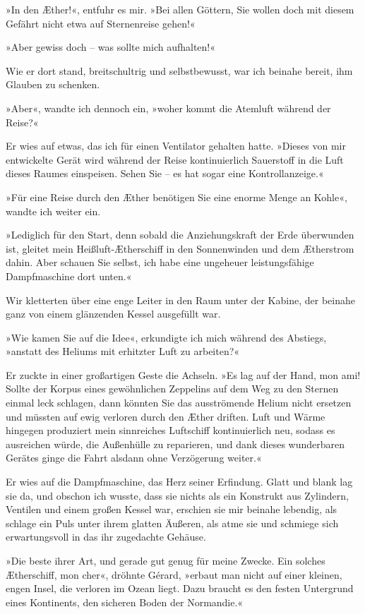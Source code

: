 »In den Æther!«, entfuhr es mir. »Bei allen Göttern, Sie wollen
doch mit diesem Gefährt nicht etwa auf Sternenreise gehen!«

»Aber gewiss doch – was sollte mich aufhalten!«

Wie er dort stand, breitschultrig und selbstbewusst, war ich
beinahe bereit, ihm Glauben zu schenken.

»Aber«, wandte ich dennoch ein, »woher kommt die Atemluft während
der Reise?«

Er wies auf etwas, das ich für einen Ventilator gehalten hatte.
»Dieses von mir entwickelte Gerät wird während der Reise
kontinuierlich Sauerstoff in die Luft dieses Raumes einspeisen.
Sehen Sie – es hat sogar eine Kontrollanzeige.«

»Für eine Reise durch den Æther benötigen Sie eine enorme Menge an
Kohle«, wandte ich weiter ein.

»Lediglich für den Start, denn sobald die Anziehungskraft der Erde
überwunden ist, gleitet mein Heißluft-Ætherschiff in den
Sonnenwinden und dem Ætherstrom dahin. Aber schauen Sie selbst, ich
habe eine ungeheuer leistungsfähige Dampfmaschine dort unten.«

Wir kletterten über eine enge Leiter in den Raum unter der Kabine,
der beinahe ganz von einem glänzenden Kessel ausgefüllt war.

»Wie kamen Sie auf die Idee«, erkundigte ich mich während des
Abstiegs, »anstatt des Heliums mit erhitzter Luft zu arbeiten?«

Er zuckte in einer großartigen Geste die Achseln. »Es lag auf der
Hand, mon ami! Sollte der Korpus eines gewöhnlichen Zeppelins auf
dem Weg zu den Sternen einmal leck schlagen, dann könnten Sie das
ausströmende Helium nicht ersetzen und müssten auf ewig verloren
durch den Æther driften. Luft und Wärme hingegen produziert mein
sinnreiches Luftschiff kontinuierlich neu, sodass es ausreichen
würde, die Außenhülle zu reparieren, und dank dieses wunderbaren
Gerätes ginge die Fahrt alsdann ohne Verzögerung weiter.«

Er wies auf die Dampfmaschine, das Herz seiner Erfindung. Glatt und
blank lag sie da, und obschon ich wusste, dass sie nichts als ein
Konstrukt aus Zylindern, Ventilen und einem großen Kessel war,
erschien sie mir beinahe lebendig, als schlage ein Puls unter ihrem
glatten Äußeren, als atme sie und schmiege sich erwartungsvoll in
das ihr zugedachte Gehäuse.

»Die beste ihrer Art, und gerade gut genug für meine Zwecke. Ein
solches Ætherschiff, mon cher«, dröhnte Gérard, »erbaut man nicht
auf einer kleinen, engen Insel, die verloren im Ozean liegt. Dazu
braucht es den festen Untergrund eines Kontinents, den sicheren
Boden der Normandie.«

